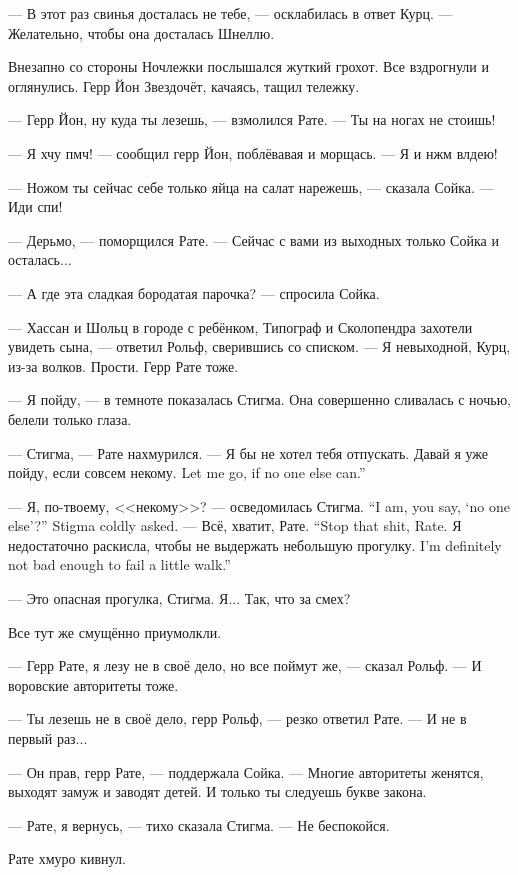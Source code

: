 --- В этот раз свинья досталась не тебе, --- осклабилась в ответ Курц.
--- Желательно, чтобы она досталась Шнеллю.

Внезапно со стороны Ночлежки послышался жуткий грохот.
Все вздрогнули и оглянулись.
Герр Йон Звездочёт, качаясь, тащил тележку.

--- Герр Йон, ну куда ты лезешь, --- взмолился Рате.
--- Ты на ногах не стоишь!

--- Я хчу пмч! --- сообщил герр Йон, поблёвавая и морщась.
--- Я и нжм влдею!

--- Ножом ты сейчас себе только яйца на салат нарежешь, --- сказала Сойка.
--- Иди спи!

--- Дерьмо, --- поморщился Рате.
--- Сейчас с вами из выходных только Сойка и осталась...

--- А где эта сладкая бородатая парочка? --- спросила Сойка.

--- Хассан и Шольц в городе с ребёнком, Типограф и Сколопендра захотели увидеть сына, --- ответил Рольф, сверившись со списком.
--- Я невыходной, Курц, из-за волков.
Прости.
Герр Рате тоже.

--- Я пойду, --- в темноте показалась Стигма.
Она совершенно сливалась с ночью, белели только глаза.

--- Стигма, --- Рате нахмурился.
--- Я бы не хотел тебя отпускать.
{Давай я уже пойду, если совсем некому.}
{Let me go, if no one else can.''}

{--- Я, по-твоему, <<некому>>? --- осведомилась Стигма.}
{``I am, you say, `no one else'?'' Stigma coldly asked.}
{--- Всё, хватит, Рате.}
{``Stop that shit, Rate.}
{Я недостаточно раскисла, чтобы не выдержать небольшую прогулку.}
{I'm definitely not bad enough to fail a little walk.''}

--- Это опасная прогулка, Стигма.
Я...
Так, что за смех?

Все тут же смущённо приумолкли.

--- Герр Рате, я лезу не в своё дело, но все поймут же, --- сказал Рольф.
--- И воровские авторитеты тоже.

--- Ты лезешь не в своё дело, герр Рольф, --- резко ответил Рате.
--- И не в первый раз...

--- Он прав, герр Рате, --- поддержала Сойка.
--- Многие авторитеты женятся, выходят замуж и заводят детей.
И только ты следуешь букве закона.

--- Рате, я вернусь, --- тихо сказала Стигма.
--- Не беспокойся.

Рате хмуро кивнул.

